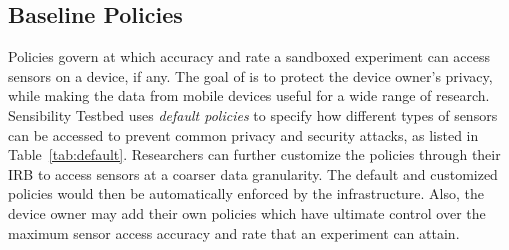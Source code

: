 

%



\subsection{Baseline Policies}\label{sec-policy-design}

Policies govern at which accuracy and rate a sandboxed experiment can 
access sensors on a device, if any. 
The goal of \sysname is to protect the device owner's privacy, while making
the data from mobile devices useful for a wide range of research. 
Sensibility Testbed uses \textit{default policies} to specify how 
different types of sensors can be accessed to prevent common privacy and
security attacks, %
as listed in Table~\ref{tab:default}. 
Researchers can further customize the policies through their IRB
to access sensors at a coarser data granularity. The default and 
customized policies would then be automatically enforced by the \sysname 
infrastructure. 
Also, the device owner may add their own policies which have ultimate 
control over the maximum sensor access accuracy and rate that an 
experiment can attain.

